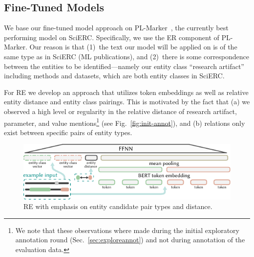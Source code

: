 \subsection{Fine-Tuned Models}

%


We base our fine-tuned model approach on PL-Marker~\cite{Ye2022}, the currently best performing model on SciERC. Specifically, we use the ER component of PL-Marker. Our reason is that (1)~the text our model will be applied on is of the same type as in SciERC (ML publications), and (2)~there is some correspondence between the entities to be identified---namely our entity class ``research artifact'' including methods and datasets, which are both entity classes in SciERC.

For RE we develop an approach that utilizes token embeddings as well as relative entity distance and entity class pairings. This is motivated by the fact that (a) we observed a high level or regularity in the relative distance of research artifact, parameter, and value mentions\footnote{We note that these observations where made during the initial exploratory annotation round (Sec.~\ref{sec:exploreannot}) and not during annotation of the evaluation data.} (see Fig.~\ref{fig:init-annot}), and (b) relations only exist between specific pairs of entity types.

\begin{figure}[bt]
  \centering
  \includegraphics[width=.8\linewidth]{figures/ref_params/ffnn_re_sub_visual_v2}
  \caption{RE with emphasis on entity candidate pair types and distance.}
  \label{fig:ffnn-re-sub-visual}
\end{figure}

